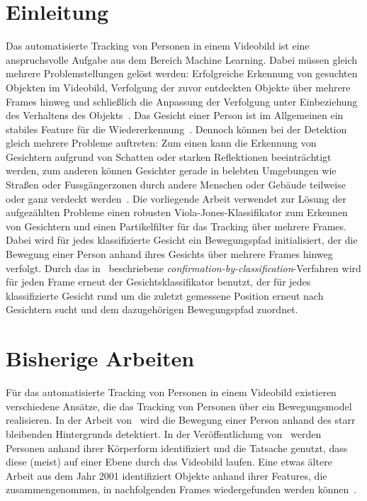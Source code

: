 \documentclass[a4paper, 11pt, twocolumn]{article}
\begin{document}
\section{Einleitung} %
\label{sec:einleitung}
Das automatisierte Tracking von Personen in einem Videobild ist eine anspruchsvolle Aufgabe aus dem Bereich Machine Learning. Dabei müssen gleich mehrere Problemstellungen gelöst werden: Erfolgreiche Erkennung von gesuchten Objekten im Videobild, Verfolgung der zuvor entdeckten Objekte über mehrere Frames hinweg und schließlich die Anpassung der Verfolgung unter Einbeziehung des Verhaltens des Objekts~\cite{Yilmaz2006}. 
Das Gesicht einer Person ist im Allgemeinen ein stabiles Feature für die Wiedererkennung~\cite{ViolaRobustObject2001}. Dennoch können bei der Detektion gleich mehrere Probleme auftreten: 
Zum einen kann die Erkennung von Gesichtern aufgrund von Schatten oder starken Reflektionen beeinträchtigt werden, zum anderen können Gesichter gerade in belebten Umgebungen wie Straßen oder Fussgängerzonen durch andere Menschen oder Gebäude teilweise oder ganz verdeckt werden~\cite{aliMultipleHuman}. 
Die vorliegende Arbeit verwendet zur Lösung der aufgezählten Probleme einen robusten Viola-Jones-Klassifikator zum Erkennen von Gesichtern und einen Partikelfilter für das Tracking über mehrere Frames. Dabei wird für jedes klassifizierte Gesicht ein Bewegungspfad initialisiert, der die Bewegung einer Person anhand ihres Gesichts über mehrere Frames hinweg verfolgt. Durch das in~\cite{aliMultipleHuman} beschriebene \emph{confirmation-by-classification}-Verfahren wird für jeden Frame erneut der Gesichtsklassifikator benutzt, der für jedes klassifizierte Gesicht rund um die zuletzt gemessene Position erneut nach Gesichtern sucht und dem dazugehörigen Bewegungspfad zuordnet. 


\section{Bisherige Arbeiten} %
\label{sec:bisherige_arbeiten}

Für das automatisierte Tracking von Personen in einem Videobild existieren verschiedene Ansätze, die das Tracking von Personen über ein Bewegungsmodel realisieren. In der Arbeit von~\cite{zhaoSegmentationTracking} wird die Bewegung einer Person anhand des starr bleibenden Hintergrunds detektiert. In der Veröffentlichung von~\cite{Zhao2004} werden Personen anhand ihrer Körperform identifiziert und die Tatsache genutzt, dass diese (meist) auf einer Ebene durch das Videobild laufen. Eine etwas ältere Arbeit aus dem Jahr 2001 identifiziert Objekte anhand ihrer Features, die zusammengenommen, in nachfolgenden Frames wiedergefunden werden können~\cite{Veenman2001}.
\end{document}

